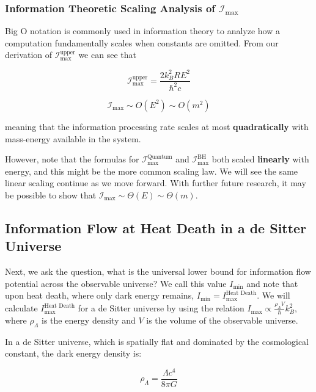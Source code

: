 \documentclass[12pt]{article}
\begin{document}
\subsubsection{Information Theoretic Scaling Analysis of $\mathcal{I}_{\max}$}

Big O notation is commonly used in information theory to analyze how a computation fundamentally scales when constants are omitted. From our derivation of $\mathcal{I}_{\text{max}}^{\text{upper}}$ we can see that

\[
\mathcal{I}_{\text{max}}^{\text{upper}} =\frac{2 k_B^2 R E^2}{\hbar^2 c}
\]

\begin{equation}
    \mathcal{I}_{\max} \sim O(E^2) \sim O(m^2)
\end{equation}

meaning that the information processing rate scales at most \textbf{quadratically} with mass-energy available in the system.

However, note that the formulas for $\mathcal{I}_{\text{max}}^{\text{Quantum}}$ and $\mathcal{I}_{\text{max}}^{\text{BH}}$ both scaled \textbf{linearly} with energy, and this might be the more common scaling law. We will see the same linear scaling continue as we move forward. With further future research, it may be possible to show that $\mathcal{I}_{\max} \sim \Theta(E) \sim \Theta(m)$.

\subsection{Information Flow at Heat Death in a de Sitter Universe}

Next, we ask the question, what is the universal lower bound for information flow potential across the observable universe? We call this value $I_{\text{min}}$ and note that upon heat death, where only dark energy remains, $I_{\text{min}} = I_{\text{max}}^{\text{Heat Death}}$. We will calculate $I_{\text{max}}^{\text{Heat Death}}$ for a de Sitter universe by using the relation $I_{\text{max}} \propto \frac{\rho_\Lambda V}{\hbar} k_B^2$, where $\rho_\Lambda$ is the energy density and $V$ is the volume of the observable universe.

In a de Sitter universe, which is spatially flat and dominated by the cosmological constant, the dark energy density is:

\begin{equation}
    \rho_\Lambda = \frac{\Lambda c^4}{8 \pi G}
\end{equation}
\end{document}
